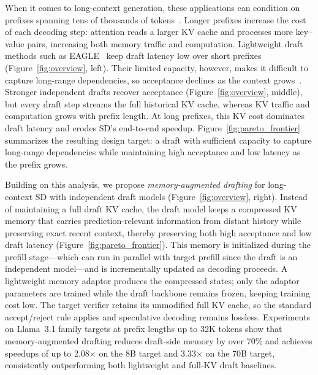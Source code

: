 When it comes to long-context generation, these applications can condition on prefixes spanning tens of thousands of tokens~\citep{conf/acl/BaiLZL0HDLZHDTL24}.
Longer prefixes increase the cost of each decoding step: attention reads a larger KV cache and processes more key--value pairs, increasing both memory traffic and computation.
Lightweight draft methods such as EAGLE~\citep{pmlr-v235-li24bt} keep draft latency low over short prefixes (Figure~\ref{fig:overview}, left).
Their limited capacity, however, makes it difficult to capture long-range dependencies, so acceptance declines as the context grows~\citep{chen2025rapid,bhendawade-etal-2025-speculative,huo2026repspec}.
Stronger independent drafts recover acceptance (Figure~\ref{fig:overview}, middle), but every draft step streams the full historical KV cache,
whereas KV traffic and computation grows with prefix length.
At long prefixes, this KV cost dominates draft latency and erodes SD's end-to-end speedup.
Figure~\ref{fig:pareto_frontier} summarizes the resulting design target: a draft with sufficient capacity to capture long-range dependencies while maintaining high acceptance and low latency as the prefix grows.

Building on this analysis, we propose \emph{memory-augmented drafting} for long-context SD with independent draft models (Figure~\ref{fig:overview}, right).
Instead of maintaining a full draft KV cache, the draft model keeps a compressed KV memory that carries prediction-relevant information from distant history while preserving exact recent context, thereby preserving both high acceptance and low draft latency (Figure~\ref{fig:pareto_frontier}).
This memory is initialized during the prefill stage---which can run in parallel with target prefill since the draft is an independent model---and is incrementally updated as decoding proceeds.
A lightweight memory adaptor produces the compressed states; only the adaptor parameters are trained while the draft backbone remains frozen, keeping training cost low.
The target verifier retains its unmodified full KV cache, so the standard accept/reject rule applies and speculative decoding remains lossless.
Experiments on Llama~3.1 family targets at prefix lengths up to 32K tokens show that memory-augmented drafting reduces draft-side memory by over 70\% and achieves speedups of up to 2.08$\times$ on the 8B target and 3.33$\times$ on the 70B target, consistently outperforming both lightweight and full-KV draft baselines.

